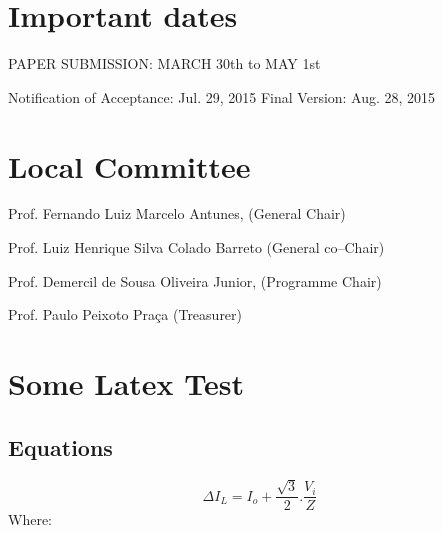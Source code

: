 \documentclass[a4paper,oneside,onecolumn,draftcls,12pt,conference]{IEEEtran}
\begin{document}




\section{Important dates }

PAPER SUBMISSION: MARCH 30th to MAY 1st

Notification of Acceptance:     Jul. 29, 2015 Final Version:	Aug. 28, 2015






\section*{Local Committee}


Prof. Fernando Luiz Marcelo Antunes, (General Chair)  
 
Prof. Luiz Henrique Silva Colado Barreto (General co--Chair) 

Prof. Demercil de Sousa Oliveira Junior, (Programme Chair)

Prof. Paulo Peixoto Praça (Treasurer)





\section{Some Latex Test}

 
 \subsection{Equations}
 \begin{equation}
 \Delta I_{L}=I_{o}+\frac{\sqrt{3}}{2}.\frac{V_{i}}{Z}
 \end{equation}
 Where:
 
\end{document}
